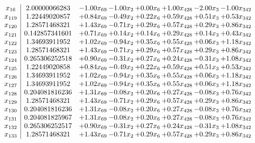 \documentclass[8pt]{article}
\begin{document}
\[\begin{array}{c| c c@{\hskip 2pt} c@{\hskip 2pt} c@{\hskip 2pt} c@{\hskip 2pt} c@{\hskip 2pt} c@{\hskip 2pt} }
 x_{16}   &  2.00000066283 & -1.00 x_{69} & -1.00 x_{2} & +  0.00 x_{6} & +  1.00 x_{428} & -2.00 x_{3} & -1.00 x_{342}\\
 x_{119}   &  1.22449020857 & +  0.84 x_{69} & -0.49 x_{2} & +  0.22 x_{6} & +  0.59 x_{428} & +  0.51 x_{3} & +  0.53 x_{342}\\
 x_{120}   &  1.28571468321 & +  1.43 x_{69} & -0.71 x_{2} & +  0.29 x_{6} & +  0.57 x_{428} & +  0.29 x_{3} & +  0.86 x_{342}\\
 x_{121}   &  0.142857341601 & +  0.71 x_{69} & +  0.14 x_{2} & +  0.14 x_{6} & +  0.29 x_{428} & +  0.14 x_{3} & +  0.43 x_{342}\\
 x_{122}   &  1.34693911952 & +  1.02 x_{69} & -0.94 x_{2} & +  0.35 x_{6} & +  0.55 x_{428} & +  0.06 x_{3} & +  1.18 x_{342}\\
 x_{123}   &  1.28571468321 & +  1.43 x_{69} & -0.71 x_{2} & +  0.29 x_{6} & +  0.57 x_{428} & +  0.29 x_{3} & +  0.86 x_{342}\\
 x_{124}   &  0.265306252518 & +  0.90 x_{69} & -0.31 x_{2} & +  0.27 x_{6} & +  0.24 x_{428} & -0.31 x_{3} & +  1.08 x_{342}\\
 x_{125}   &  1.22449020858 & +  0.84 x_{69} & -0.49 x_{2} & +  0.22 x_{6} & +  0.59 x_{428} & +  0.51 x_{3} & +  0.53 x_{342}\\
 x_{126}   &  1.34693911952 & +  1.02 x_{69} & -0.94 x_{2} & +  0.35 x_{6} & +  0.55 x_{428} & +  0.06 x_{3} & +  1.18 x_{342}\\
 x_{127}   &  1.34693911952 & +  1.02 x_{69} & -0.94 x_{2} & +  0.35 x_{6} & +  0.55 x_{428} & +  0.06 x_{3} & +  1.18 x_{342}\\
 x_{128}   &  0.204081816236 & +  1.31 x_{69} & -0.08 x_{2} & +  0.20 x_{6} & +  0.27 x_{428} & -0.08 x_{3} & +  0.76 x_{342}\\
 x_{129}   &  1.28571468321 & +  1.43 x_{69} & -0.71 x_{2} & +  0.29 x_{6} & +  0.57 x_{428} & +  0.29 x_{3} & +  0.86 x_{342}\\
 x_{130}   &  0.204081816236 & +  1.31 x_{69} & -0.08 x_{2} & +  0.20 x_{6} & +  0.27 x_{428} & -0.08 x_{3} & +  0.76 x_{342}\\
 x_{131}   &  0.204081825967 & +  1.31 x_{69} & -0.08 x_{2} & +  0.20 x_{6} & +  0.27 x_{428} & -0.08 x_{3} & +  0.76 x_{342}\\
 x_{132}   &  0.265306252517 & +  0.90 x_{69} & -0.31 x_{2} & +  0.27 x_{6} & +  0.24 x_{428} & -0.31 x_{3} & +  1.08 x_{342}\\
 x_{133}   &  1.28571468321 & +  1.43 x_{69} & -0.71 x_{2} & +  0.29 x_{6} & +  0.57 x_{428} & +  0.29 x_{3} & +  0.86 x_{342}\\

\end{array}\]
\end{document}
